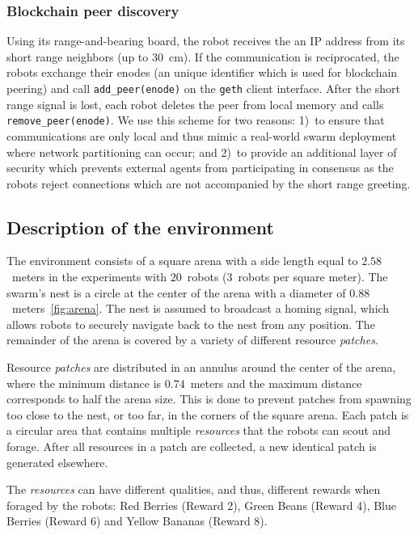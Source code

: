 \documentclass[runningheads]{llncs}
\newcommand{\rab}{range-and-bearing\xspace}
\begin{document}
\subsubsection{Blockchain peer discovery}
\label{sec:peer-discovery}

Using its \rab board, the robot receives the an IP address from its short range neighbors (up to $30$~cm). If the communication is reciprocated, the robots exchange their enodes (an unique identifier which is used for blockchain peering) and call \texttt{add\_peer(enode)} on the \texttt{geth} client interface. After the short range signal is lost, each robot deletes the peer from local memory and calls \texttt{remove\_peer(enode)}. We use this scheme for two reasons: 1)~to ensure that communications are only local and thus mimic a real-world swarm deployment where network partitioning can occur; and 2)~to provide an additional layer of security which prevents external agents from participating in consensus as the robots reject connections which are not accompanied by the short range greeting.

\subsection{Description of the environment}
\label{subsec:env}

The environment consists of a square arena with a side length equal to $2.58$~meters in the experiments with $20$~robots ($3$~robots per square meter). The swarm's nest is a circle at the center of the arena with a diameter of $0.88$~meters~\ref{fig:arena}. The nest is assumed to broadcast a homing signal, which allows robots to securely navigate back to the nest from any position. The remainder of the arena is covered by a variety of different resource \emph{patches}.

Resource \emph{patches} are distributed in an annulus around the center of the arena, where the minimum distance is $0.74$~meters and the maximum distance corresponds to half the arena size. This is done to prevent patches from spawning too close to the nest, or too far, in the corners of the square arena. Each patch is a circular area that contains multiple \emph{resources} that the robots can scout and forage. After all resources in a patch are collected, a new identical patch is generated elsewhere.

The \emph{resources} can have different qualities, and thus, different rewards when foraged by the robots: Red Berries (Reward 2), Green Beans (Reward 4), Blue Berries (Reward 6) and Yellow Bananas (Reward 8). 
\end{document}

